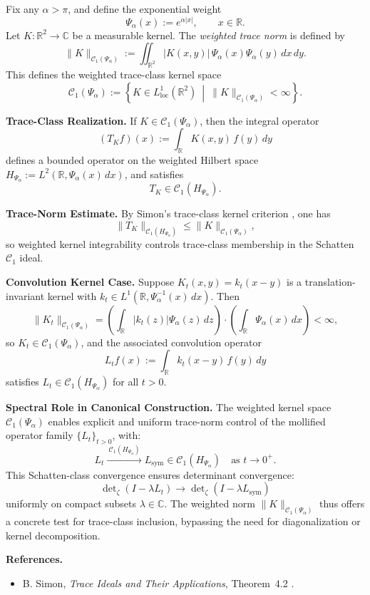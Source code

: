 \begin{definition}\label{def:weighted-trace-norm-space}
Fix any \( \alpha > \pi \), and define the exponential weight
\[
\Psi_\alpha(x) := e^{\alpha |x|}, \qquad x \in \mathbb{R}.
\]
Let \( K \colon \mathbb{R}^2 \to \mathbb{C} \) be a measurable kernel. The \emph{weighted trace norm} is defined by
\[
\| K \|_{\mathcal{C}_1(\Psi_\alpha)} := \iint_{\mathbb{R}^2} |K(x,y)| \, \Psi_\alpha(x) \Psi_\alpha(y)\, dx\,dy.
\]
This defines the weighted trace-class kernel space
\[
\mathcal{C}_1(\Psi_\alpha) := \left\{ K \in L^1_{\mathrm{loc}}(\mathbb{R}^2) \ \middle|\ \| K \|_{\mathcal{C}_1(\Psi_\alpha)} < \infty \right\}.
\]

\medskip
\noindent\textbf{Trace-Class Realization.}
If \( K \in \mathcal{C}_1(\Psi_\alpha) \), then the integral operator
\[
(T_K f)(x) := \int_{\mathbb{R}} K(x,y)\, f(y)\, dy
\]
defines a bounded operator on the weighted Hilbert space \( H_{\Psi_\alpha} := L^2(\mathbb{R}, \Psi_\alpha(x)\, dx) \), and satisfies
\[
T_K \in \mathcal{C}_1(H_{\Psi_\alpha}).
\]

\medskip
\noindent\textbf{Trace-Norm Estimate.}
By Simon’s trace-class kernel criterion \cite[Thm.~4.2]{Simon2005TraceIdeals}, one has
\[
\|T_K\|_{\mathcal{C}_1(H_{\Psi_\alpha})} \le \|K\|_{\mathcal{C}_1(\Psi_\alpha)},
\]
so weighted kernel integrability controls trace-class membership in the Schatten \(\mathcal{C}_1\) ideal.

\medskip
\noindent\textbf{Convolution Kernel Case.}
Suppose \( K_t(x,y) = k_t(x - y) \) is a translation-invariant kernel with \( k_t \in L^1(\mathbb{R}, \Psi_\alpha^{-1}(x)\, dx) \). Then
\[
\| K_t \|_{\mathcal{C}_1(\Psi_\alpha)} = \left( \int_{\mathbb{R}} |k_t(z)| \Psi_\alpha(z)\, dz \right) \cdot \left( \int_{\mathbb{R}} \Psi_\alpha(x)\, dx \right) < \infty,
\]
so \( K_t \in \mathcal{C}_1(\Psi_\alpha) \), and the associated convolution operator
\[
L_t f(x) := \int_{\mathbb{R}} k_t(x - y)\, f(y)\, dy
\]
satisfies \( L_t \in \mathcal{C}_1(H_{\Psi_\alpha}) \) for all \( t > 0 \).

\medskip
\noindent\textbf{Spectral Role in Canonical Construction.}
The weighted kernel space \( \mathcal{C}_1(\Psi_\alpha) \) enables explicit and uniform trace-norm control of the mollified operator family \( \{L_t\}_{t > 0} \), with:
\[
L_t \xrightarrow{\ \mathcal{C}_1(H_{\Psi_\alpha})\ } L_{\mathrm{sym}} \in \mathcal{C}_1(H_{\Psi_\alpha}) \quad \text{as } t \to 0^+.
\]
This Schatten-class convergence ensures determinant convergence:
\[
\det\nolimits_\zeta(I - \lambda L_t) \to \det\nolimits_\zeta(I - \lambda L_{\mathrm{sym}})
\]
uniformly on compact subsets \( \lambda \in \mathbb{C} \). The weighted norm \( \|K\|_{\mathcal{C}_1(\Psi_\alpha)} \) thus offers a concrete test for trace-class inclusion, bypassing the need for diagonalization or kernel decomposition.

\medskip
\noindent\textbf{References.}
\begin{itemize}
    \item B. Simon, \emph{Trace Ideals and Their Applications}, Theorem~4.2 \cite{Simon2005TraceIdeals}.
\end{itemize}
\end{definition}

